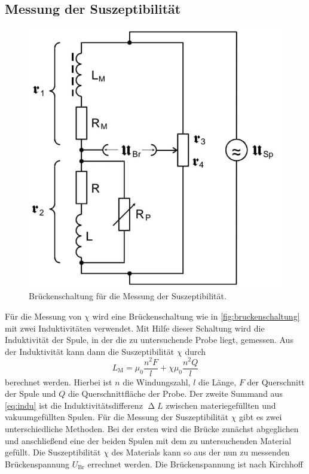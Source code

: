 \subsection{Messung der Suszeptibilität}
\begin{figure}[H]
	\centering
	\includegraphics[width=0.7\linewidth]{data/brueckenschaltung.jpeg}
	\caption{Brückenschaltung für die Messung der Suszeptibilität.}
	\label{fig:bruckenschaltung}
\end{figure}
Für die Messung von $\chi$ wird eine Brückenschaltung wie in \autoref{fig:bruckenschaltung} mit zwei Induktivitäten verwendet. Mit Hilfe dieser Schaltung wird die
Induktivität der Spule, in der die zu untersuchende Probe liegt, gemessen.
\newline
Aus der Induktivität kann dann die Suszeptibilität $\chi$ durch
\begin{equation}
\label{eq:indu}
L_\text{M} = \mu_0 \frac{n^2F}{l} + \chi \mu_0 \frac{n^2Q}{l}
\end{equation}
berechnet werden.
Hierbei ist $n$ die Windungszahl, $l$ die Länge, $F$ der Querschnitt der Spule und $Q$ die Querschnittfläche der Probe.
Der zweite Summand aus \autoref{eq:indu} ist die Induktivitätsdifferenz $\upDelta L$ zwischen materiegefüllten und vakuumgefüllten Spulen.
\newline
Für die Messung der Suszeptibilität $\chi$ gibt es zwei unterschiedliche Methoden.
Bei der ersten wird die Brücke zunächst abgeglichen und anschließend eine der beiden Spulen mit dem zu untersuchenden
Material gefüllt. Die Suszeptibilität $\chi$ des Materials kann so aus der nun zu messenden Brückenspannung $U_\text{Br}$ errechnet werden.
Die Brückenspannung ist nach Kirchhoff
